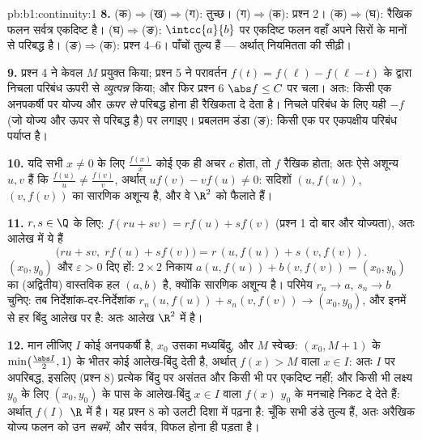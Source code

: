 \begin{solution}{pb:b1:continuity:1}
\textbf{8.} (क)$\Rightarrow$(ख)$\Rightarrow$(ग): तुच्छ। (ग)$\Rightarrow$(क):
प्रश्न 2। (क)$\Rightarrow$(घ): रैखिक फलन सर्वत्र एकदिष्ट है।
(घ)$\Rightarrow$(ङ): $\intcc{a}{b}$ पर एकदिष्ट फलन वहाँ अपने सिरों के मानों
से परिबद्ध है। (ङ)$\Rightarrow$(क): प्रश्न 4--6। पाँचों  तुल्य हैं ---
अर्थात् नियमितता की सीढ़ी।

\textbf{9.} प्रश्न 4 ने केवल  $M$ प्रयुक्त किया; प्रश्न 5 ने
परावर्तन $f(t) = f(\ell) - f(\ell - t)$ के द्वारा निचला परिबंध ऊपरी से
\emph{व्युत्पन्न} किया; और फिर प्रश्न 6 $\abs f \leq C$ पर चला। अतः: किसी एक
अनपकर्षी  पर योज्य और \emph{ऊपर से} परिबद्ध होना ही रैखिकता दे देता
है। निचले परिबंध के लिए यही $-f$ (जो योज्य और ऊपर से परिबद्ध है) पर लगाइए।
प्रबलतम डंडा (ङ): किसी एक  पर एकपक्षीय परिबंध पर्याप्त है।

\textbf{10.} यदि सभी $x \neq 0$ के लिए $\frac{f(x)}{x}$ कोई एक ही अचर $c$
होता, तो $f$ रैखिक होता; अतः ऐसे अशून्य $u, v$ हैं कि $\frac{f(u)}u \neq
\frac{f(v)}v$, अर्थात् $u f(v) - v f(u) \neq 0$: सदिशों $(u, f(u))$, $(v,
f(v))$ का सारणिक अशून्य है, और वे $\R^2$ को फैलाते हैं।

\textbf{11.} $r, s \in \Q$ के लिए: $f(ru + sv) = r f(u) + s f(v)$ (प्रश्न 1
दो बार और योज्यता), अतः आलेख में ये हैं
\[
\bigl(ru + sv,\; r f(u) + s f(v)\bigr)
= r\,(u, f(u)) + s\,(v, f(v)) .
\]
$(x_0, y_0)$ और $\varepsilon > 0$ दिए हों: $2 \times 2$ निकाय $a(u, f(u)) +
b(v, f(v)) = (x_0, y_0)$ का (अद्वितीय) वास्तविक हल $(a, b)$ है, क्योंकि
सारणिक अशून्य है। परिमेय $r_n \to a$, $s_n \to b$ चुनिए: तब
निर्देशांक-दर-निर्देशांक $r_n(u, f(u)) + s_n(v, f(v)) \to (x_0, y_0)$, और
इनमें से हर बिंदु आलेख पर है: अतः आलेख $\R^2$ में  है।

\textbf{12.} मान लीजिए $I$ कोई अनपकर्षी  है, $x_0$ उसका मध्यबिंदु, और
$M$ स्वेच्छ:  $(x_0, M + 1)$ के $\min\bigl(\frac{\abs I}{2}, 1\bigr)$
के भीतर कोई आलेख-बिंदु देती है, अर्थात् $f(x) > M$ वाला $x \in I$: अतः $I$
पर अपरिबद्ध, इसलिए (प्रश्न 8) प्रत्येक बिंदु पर असंतत और किसी भी  पर
एकदिष्ट नहीं; और किसी भी लक्ष्य $y_0$ के लिए $(x_0, y_0)$ के पास के
आलेख-बिंदु $x \in I$ वाला $f(x)$ $y_0$ के मनचाहे निकट दे देते हैं: अर्थात्
$f(I)$ $\R$ में  है। यह प्रश्न 8 को उलटी दिशा में पढ़ना है: चूँकि सभी
डंडे तुल्य हैं, अतः अरैखिक योज्य फलन को उन \emph{सबमें}, और सर्वत्र, विफल
होना ही पड़ता है।


\end{solution}
